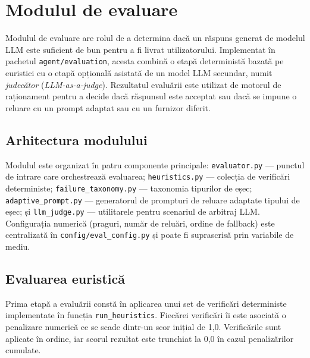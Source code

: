 \documentclass[12pt, a4paper, oneside, romanian]{teza-upb}
\begin{document}
\section{Modulul de evaluare}
\label{sec:evaluare}

Modulul de evaluare are rolul de a determina dacă un răspuns generat de modelul LLM este suficient de bun pentru a fi livrat utilizatorului. Implementat în pachetul \texttt{agent/evaluation}, acesta combină o etapă deterministă bazată pe euristici cu o etapă opțională asistată de un model LLM secundar, numit \textit{judecător} (\textit{LLM-as-a-judge}). Rezultatul evaluării este utilizat de motorul de raționament pentru a decide dacă răspunsul este acceptat sau dacă se impune o reluare cu un prompt adaptat sau cu un furnizor diferit.

\subsection{Arhitectura modulului}

Modulul este organizat în patru componente principale: \texttt{evaluator.py} — punctul de intrare care orchestrează evaluarea; \texttt{heuristics.py} — colecția de verificări deterministe; \texttt{failure\_taxonomy.py} — taxonomia tipurilor de eșec; \texttt{adaptive\_prompt.py} — generatorul de prompturi de reluare adaptate tipului de eșec; și \texttt{llm\_judge.py} — utilitarele pentru scenariul de arbitraj LLM. Configurația numerică (praguri, număr de reluări, ordine de fallback) este centralizată în \texttt{config/eval\_config.py} și poate fi suprascrisă prin variabile de mediu.

\subsection{Evaluarea euristică}

Prima etapă a evaluării constă în aplicarea unui set de verificări deterministe implementate în funcția \texttt{run\_heuristics}. Fiecărei verificări îi este asociată o penalizare numerică ce se scade dintr-un scor inițial de 1,0. Verificările sunt aplicate în ordine, iar scorul rezultat este trunchiat la 0,0 în cazul penalizărilor cumulate.
\end{document}
